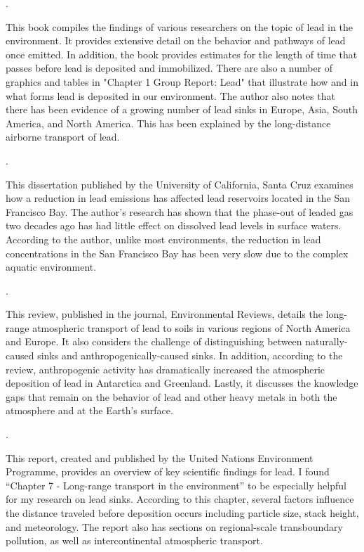 \documentclass{article}
\begin{document}
\medskip

\noindent {}.

\medskip

This book compiles the findings of various researchers on the topic of lead in the environment. It provides extensive detail on the behavior and pathways of lead once emitted. In addition, the book provides estimates for the length of time that passes before lead is deposited and immobilized. There are also a number of graphics and tables in "Chapter 1 Group Report: Lead" that illustrate how and in what forms lead is deposited in our environment. The author also notes that there has been evidence of a growing number of lead sinks in Europe, Asia, South America, and North America. This has been explained by the long-distance airborne transport of lead.

\medskip

\noindent {}.

\medskip

This dissertation published by the University of California, Santa Cruz examines how a reduction in lead emissions has affected lead reservoirs located in the San Francisco Bay. The author’s research has shown that the phase-out of leaded gas two decades ago has had little effect on dissolved lead levels in surface waters. According to the author, unlike most environments, the reduction in lead concentrations in the San Francisco Bay has been very slow due to the complex aquatic environment.

\medskip

\noindent {}.

\medskip

This review, published in the journal, Environmental Reviews, details the long-range atmospheric transport of lead to soils in various regions of North America and Europe. It also considers the challenge of distinguishing between naturally-caused sinks and anthropogenically-caused sinks. In addition, according to the review, anthropogenic activity has dramatically increased the atmospheric deposition of lead in Antarctica and Greenland. Lastly, it discusses the knowledge gaps that remain on the behavior of lead and other heavy metals in both the atmosphere and at the Earth’s surface.

\medskip

\noindent {}.

\medskip

This report, created and published by the United Nations Environment Programme, provides an overview of key scientific findings for lead. I found ``Chapter 7 - Long-range transport in the environment''
 to be especially helpful for my research on lead sinks. According to this chapter, several factors influence the distance traveled before deposition occurs including particle size, stack height, and meteorology. The report also has sections on regional-scale transboundary pollution, as well as intercontinental atmospheric transport.
\end{document}
